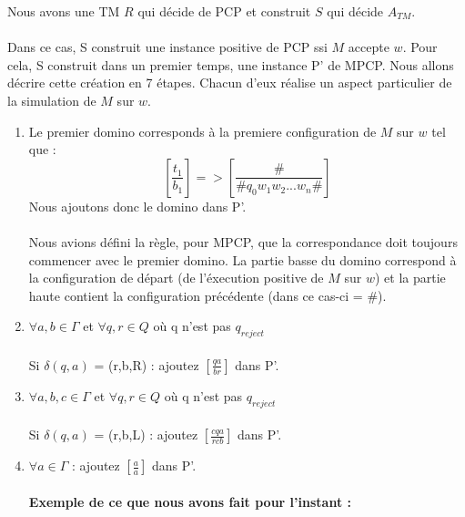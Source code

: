 Nous avons une TM $R$ qui décide de PCP et construit $S$ qui décide $A_{TM}$.

\paragraph{}
Dans ce cas, S construit une instance positive de PCP ssi $M$ accepte $w$. Pour cela, S construit dans un premier temps, une instance P' de MPCP. Nous allons décrire cette création en 7 étapes. Chacun d'eux réalise un aspect particulier de la simulation de $M$ sur $w$.

\begin{enumerate}
\item Le premier domino corresponds à la premiere configuration de $M$ sur $w$ tel que :
	\[ [\frac{t_1}{b_1}] => [\frac{\#}{\#q_0w_1w_2...w_n\#}] \] 
    Nous ajoutons donc le domino dans P'.
    \paragraph{}
    Nous avions défini la règle, pour MPCP, que la correspondance doit toujours commencer avec le premier domino. La partie basse du domino correspond à la configuration de départ (de l'éxecution positive de $M$ sur $w$) et la partie haute contient la configuration précédente (dans ce cas-ci = \#). 
    
    \item \(\forall a, b \in \Gamma\) et \(\forall q,r \in Q\) où q n'est pas $q_{reject}$
    \paragraph{}
    Si $\delta(q,a)$ =  (r,b,R) : ajoutez $[\frac{qa}{br}]$ dans P'.
    
    \item $\forall a,b,c \in \Gamma$ et $\forall q,r \in Q$ où q n'est pas $q_{reject}$
    \paragraph{}
    Si $\delta(q,a)$ = (r,b,L) : ajoutez $[\frac{cqa}{rcb}]$ dans P'.
    
    \item $\forall a \in \Gamma$ : ajoutez $[\frac{a}{a}]$ dans P'.
    \paragraph{}
    \textbf{Exemple de ce que nous avons fait pour l'instant :}

\end{enumerate}
